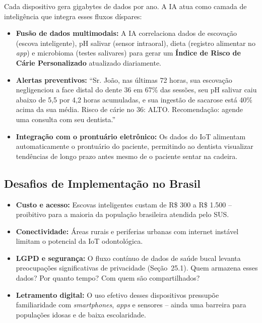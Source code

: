 Cada dispositivo gera gigabytes de dados por ano. A IA atua como camada de
inteligência que integra esses fluxos díspares:

\begin{itemize}
  \item \textbf{Fusão de dados multimodais:} A IA correlaciona dados de
    escovação (escova inteligente), pH salivar (sensor intraoral), dieta
    (registro alimentar no \textit{app}) e microbioma (testes salivares) para
    gerar um \textbf{Índice de Risco de Cárie Personalizado} atualizado
    diariamente.

  \item \textbf{Alertas preventivos:} ``Sr. João, nas últimas 72 horas, sua
    escovação negligenciou a face distal do dente 36 em 67\% das sessões,
    seu pH salivar caiu abaixo de 5,5 por 4,2 horas acumuladas, e sua ingestão
    de sacarose está 40\% acima da sua média. Risco de cárie no 36: ALTO.
    Recomendação: agende uma consulta com seu dentista.''

  \item \textbf{Integração com o prontuário eletrônico:} Os dados do IoT
    alimentam automaticamente o prontuário do paciente, permitindo ao dentista
    visualizar tendências de longo prazo antes mesmo de o paciente sentar na
    cadeira.
\end{itemize}

\subsection{Desafios de Implementação no Brasil}

\begin{itemize}
  \item \textbf{Custo e acesso:} Escovas inteligentes custam de R\$ 300 a
    R\$ 1.500 -- proibitivo para a maioria da população brasileira atendida
    pelo SUS.

  \item \textbf{Conectividade:} Áreas rurais e periferias urbanas com internet
    instável limitam o potencial da IoT odontológica.

  \item \textbf{LGPD e segurança:} O fluxo contínuo de dados de saúde bucal
    levanta preocupações significativas de privacidade (Seção~25.1). Quem
    armazena esses dados? Por quanto tempo? Com quem são compartilhados?

  \item \textbf{Letramento digital:} O uso efetivo desses dispositivos pressupõe
    familiaridade com \textit{smartphones}, \textit{apps} e sensores -- ainda
    uma barreira para populações idosas e de baixa escolaridade.
\end{itemize}

